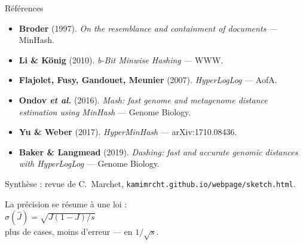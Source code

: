 \documentclass[aspectratio=169,11pt]{beamer}
\begin{document}
\begin{frame}{Références}
  \footnotesize
  \begin{itemize}
    \item \textbf{Broder} (1997). \textit{On the resemblance and containment of documents} — MinHash.
    \item \textbf{Li \& König} (2010). \textit{b-Bit Minwise Hashing} — WWW.
    \item \textbf{Flajolet, Fusy, Gandouet, Meunier} (2007). \textit{HyperLogLog} — AofA.
    \item \textbf{Ondov \textit{et al.}} (2016). \textit{Mash: fast genome and metagenome distance
          estimation using MinHash} — Genome Biology.
    \item \textbf{Yu \& Weber} (2017). \textit{HyperMinHash} — arXiv:1710.08436.
    \item \textbf{Baker \& Langmead} (2019). \textit{Dashing: fast and accurate genomic distances
          with HyperLogLog} — Genome Biology.
  \end{itemize}
  \vfill
  {\scriptsize\textcolor{cGray}{Synthèse : revue de C.~Marchet,
  \texttt{kamimrcht.github.io/webpage/sketch.html}.}}
\end{frame}

\begin{frame}[standout]
  La précision se résume à une loi :\\[2pt]
  \alert{$\sigma(\hat J) = \sqrt{J(1-J)/s}$}\\[4pt]
  plus de cases, moins d'erreur — en $1/\sqrt{s}$.
\end{frame}
\end{document}

